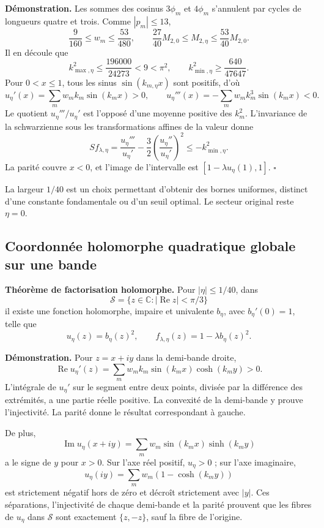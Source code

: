 \textbf{Démonstration.} Les sommes des cosinus \(3\phi_m\) et \(4\phi_m\) s’annulent par cycles de longueurs quatre et trois. Comme \(|p_m|\le13\),
\[
\frac9{160}\le w_m\le\frac{53}{480},\qquad
\frac{27}{40}M_{2,0}\le M_{2,\eta}\le\frac{53}{40}M_{2,0}.
\]
Il en découle que
\[
k_{\max,\eta}^2\le\frac{196000}{24273}<9<\pi^2,\qquad
k_{\min,\eta}^2\ge\frac{640}{47647}.
\]
Pour \(0<x\le1\), tous les sinus \(\sin(k_{m,\eta}x)\) sont positifs, d’où
\[
u_\eta'(x)=\sum_mw_mk_m\sin(k_mx)>0,\qquad
u_\eta'''(x)=-\sum_mw_mk_m^3\sin(k_mx)<0.
\]
Le quotient \(u_\eta'''/u_\eta'\) est l’opposé d’une moyenne positive des \(k_m^2\). L’invariance de la schwarzienne sous les transformations affines de la valeur donne
\[
S f_{\lambda,\eta}
=\frac{u_\eta'''}{u_\eta'}-\frac32
\left(\frac{u_\eta''}{u_\eta'}\right)^2
\le-k_{\min,\eta}^2.
\]
La parité couvre \(x<0\), et l’image de l’intervalle est
\([1-\lambda u_\eta(1),1]\). \(\square\)

La largeur \(1/40\) est un choix permettant d’obtenir des bornes uniformes, distinct d’une constante fondamentale ou d’un seuil optimal. Le secteur original reste \(\eta=0\).


\subsection{Coordonnée holomorphe quadratique globale sur une bande}
\label{hmtfg:desarrollo:4}

\textbf{Théorème de factorisation holomorphe.} Pour \(|\eta|\le1/40\), dans
\[
\mathcal S=\{z\in\mathbb C:|\operatorname{Re}z|<\pi/3\}
\]
il existe une fonction holomorphe, impaire et univalente \(b_\eta\), avec \(b_\eta'(0)=1\), telle que
\[
\boxed{u_\eta(z)=b_\eta(z)^2,\qquad
f_{\lambda,\eta}(z)=1-\lambda b_\eta(z)^2.}
\]

\textbf{Démonstration.} Pour \(z=x+iy\) dans la demi-bande droite,
\[
\operatorname{Re}u_\eta'(z)
=\sum_mw_mk_m\sin(k_mx)\cosh(k_my)>0.
\]
L’intégrale de \(u_\eta'\) sur le segment entre deux points, divisée par la différence des extrémités, a une partie réelle positive. La convexité de la demi-bande y prouve l’injectivité. La parité donne le résultat correspondant à gauche.

De plus,
\[
\operatorname{Im}u_\eta(x+iy)
=\sum_mw_m\sin(k_mx)\sinh(k_my)
\]
a le signe de \(y\) pour \(x>0\). Sur l’axe réel positif, \(u_\eta>0\) ; sur l’axe imaginaire,
\[
u_\eta(iy)=\sum_mw_m(1-\cosh(k_my))
\]
est strictement négatif hors de zéro et décroît strictement avec \(|y|\). Ces séparations, l’injectivité de chaque demi-bande et la parité prouvent que les fibres de \(u_\eta\) dans \(\mathcal S\) sont exactement \(\{z,-z\}\), sauf la fibre de l’origine.

